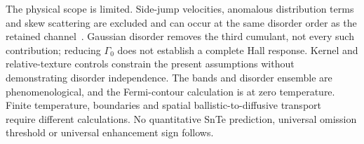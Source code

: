 The physical scope is limited. Side-jump velocities, anomalous distribution terms and skew scattering are excluded and can occur at the same disorder order as the retained channel~\cite{NandySodemann2019,Du2019}. Gaussian disorder removes the third cumulant, not every such contribution; reducing $\Gamma_0$ does not establish a complete Hall response. Kernel and relative-texture controls constrain the present assumptions without demonstrating disorder independence. The bands and disorder ensemble are phenomenological, and the Fermi-contour calculation is at zero temperature. Finite temperature, boundaries and spatial ballistic-to-diffusive transport~\cite{Liu2026} require different calculations. No quantitative SnTe prediction, universal omission threshold or universal enhancement sign follows.
